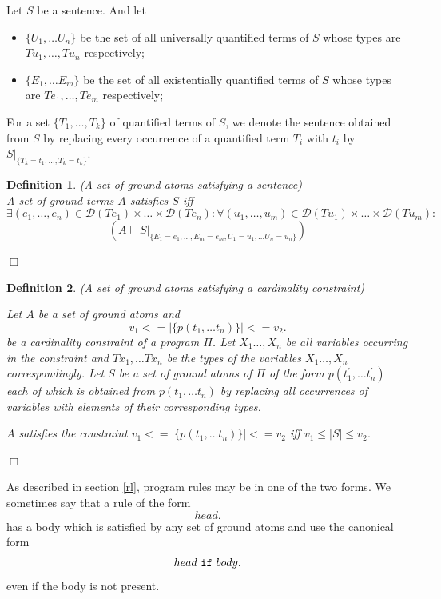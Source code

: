 \documentclass[a4paper,10pt]{article}
\newtheorem{definition}{Definition}
\begin{document}
\noindent
Let $S$ be a sentence. And let
\begin{itemize}
\item $\{U_1,\ldots U_n\}$ be the set of all universally quantified terms  of $S$ whose  types are $Tu_1,\ldots, Tu_n$ respectively;
\item $\{E_1, \ldots E_m\}$ be the set of all existentially quantified terms  of $S$ whose  types are $Te_1,\ldots, Te_m$ respectively;
\end{itemize}


\noindent\medskip
For a set $\{T_1,\ldots,T_k\}$ of quantified terms of $S$,  we denote the sentence obtained from $S$ by replacing every occurrence of a quantified term $T_i$  with $t_i$ by $S|_{\{T_k = t_1, \ldots, T_k = t_k\}}$.

\begin{definition}(A set of ground atoms satisfying a sentence)\\
\rm{
   A set of ground terms $A$ satisfies  $S$ iff
  $$ \exists (e_1,\ldots,e_n)  \in \mathcal{D}(Te_1) \times \ldots \times \mathcal{D}(Te_n): 
\forall (u_1,\ldots,u_m) \in  \mathcal{D}(Tu_1) \times \ldots \times \mathcal{D}(Tu_m):$$ $$(A \vdash S|_{\{E_1 = e_1, \ldots, E_m = e_m, U_1 = u_1,\ldots U_n = u_n\}})$$
}

\hfill$\Box$
\end{definition}

\begin{definition}(A set of ground atoms satisfying a cardinality constraint)\\
\rm{
Let $A$ be a set of ground atoms and $$v_1 <= |\{p(t_1,\ldots t_n)\}| <= v_2.$$ be a cardinality constraint of a program $\Pi$.
Let $X_1\ldots,X_n$ be all variables occurring in the constraint and $Tx_1,\ldots Tx_n$ be the types of the variables $X_1\ldots,X_n$ correspondingly. Let $S$ be a set of ground atoms of $\Pi$ of the form $p(t_1^\prime,\ldots t_n^\prime)$ each of which is obtained from $p(t_1,\ldots t_n)$ by replacing all occurrences of variables  with elements of their corresponding types.

\noindent\medskip
$A$ satisfies  the constraint $v_1 <= |\{p(t_1,\ldots t_n)\}| <= v_2$ iff $v_1 \le |S| \le v_2$. 

\hfill$\Box$

}
\end{definition}


As described in section \ref{rl}, program rules may be in one of the two forms. We sometimes say that a rule of the form $$head.$$ has a body which is satisfied by any set of ground atoms and use the canonical form $$head~\mbox{\texttt{if}}~body.$$ even if the body is not present.
\end{document}
